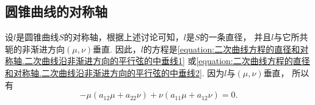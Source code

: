 \subsection{圆锥曲线的对称轴}
设\(l\)是圆锥曲线\(S\)的对称轴，根据上述讨论可知，\(l\)是\(S\)的一条直径，
并且\(l\)与它所共轭的非渐进方向\((\mu,\nu)\)垂直.
因此，\(l\)的方程是\cref{equation:二次曲线方程的直径和对称轴.二次曲线沿非渐进方向的平行弦的中垂线1}
或\cref{equation:二次曲线方程的直径和对称轴.二次曲线沿非渐进方向的平行弦的中垂线2}.
因为\(l\)与\((\mu,\nu)\)垂直，
所以有\begin{equation*}
	-\mu (a_{12} \mu + a_{22} \nu) + \nu (a_{11} \mu + a_{12} \nu) = 0.
\end{equation*}

